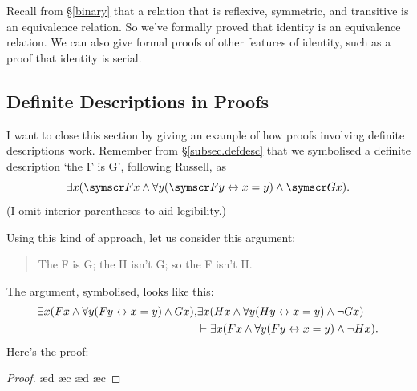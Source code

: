 Recall from §\ref{binary} that a relation that is reflexive, symmetric, and transitive is an equivalence relation. So we've formally proved that identity is an equivalence relation. We can also give formal proofs of other features of identity, such as a proof that identity is serial.

\subsection{Definite Descriptions in Proofs}

I want to close this section by giving an example of how proofs involving definite descriptions work. Remember from §\ref{subsec.defdesc} that we symbolised a definite description `the F is G', following Russell, as $$\exists x (\meta{F}x  \eand \forall y(\meta{F}y \eiff x=y) \eand \meta{G}x).$$ (I omit interior parentheses to aid legibility.) 

Using this kind of approach, let us consider this argument: \begin{quote}
	The F is G; the H isn't G; so the F isn't H.
\end{quote} The argument, symbolised, looks like this: 
\begin{align*}
	\exists x (Fx  \wedge \forall y(Fy \leftrightarrow x=y)\wedge Gx),& \exists x (Hx \wedge \forall y(Hy \leftrightarrow x=y) \wedge \neg Gx) \\ &\vdash \exists x (Fx \wedge \forall y(Fy \leftrightarrow x=y)\wedge \neg Hx).
\end{align*} Here's the proof: \begin{proof}
	\open
	\open
	\open
	\ae{d}
	\ae{c}
	\ae{d}
	\close
	\close
	\ae{c}
	\close

\end{proof}

